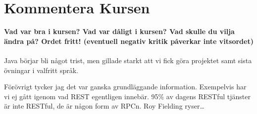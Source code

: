 \documentclass[swedish,a4paper]{article}
\begin{document}
\section{Kommentera Kursen}

\textbf{Vad var bra i kursen? Vad var dåligt i kursen? Vad skulle du vilja
  ändra på? Ordet fritt! (eventuell negativ kritik påverkar inte vitsordet)}
\\
\\
Java börjar bli något trist, men gillade starkt att vi fick göra projektet
samt sista övningar i valfritt språk.

Förövrigt tycker jag det var ganska grundläggande information. Exempelvis
har vi ej gått igenom vad REST egentligen innebär. 95\% av dagens RESTful
tjänster är inte RESTful, de är någon form av RPCn. Roy Fielding
ryser\ldots
\end{document}

